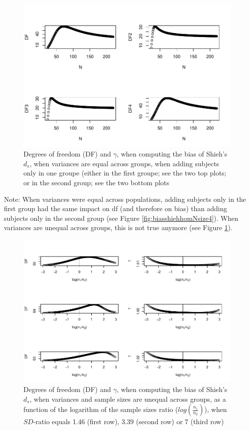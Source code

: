 \documentclass[
  man]{apa6}
\begin{document}
\begin{figure}
\centering
\includegraphics{Theoretical-Bias-of-all-estimators-as-a-function-of-population-parameters_files/figure-latex/biasshiehhetunbalNsize4-1.pdf}
\caption{\label{fig:biasshiehhetunbalNsize4}Degrees of freedom (DF) and \(\gamma\), when computing the bias of Shieh's \(d_s\), when variances are equal across groups, when adding subjects only in one groupe (either in the first groupe; see the two top plots; or in the second group; see the two bottom plots}
\end{figure}

Note: When variances were equal across populations, adding subjects only in the first group had the same impact on df (and therefore on bias) than adding subjects only in the second group (see Figure \ref{fig:biasshiehhomNsize4}). When variances are unequal across groups, this is not true anymore (see Figure \ref{fig:biasshiehhetunbalNsize4}).

\begin{figure}
\centering
\includegraphics{Theoretical-Bias-of-all-estimators-as-a-function-of-population-parameters_files/figure-latex/biasshiehhetunbaldfandbias-1.pdf}
\caption{\label{fig:biasshiehhetunbaldfandbias}Degrees of freedom (DF) and \(\gamma\), when computing the bias of Shieh's \(d_s\), when variances and sample sizes are unequal across groups, as a function of the logarithm of the sample sizes ratio (\(log \left( \frac{n_1}{n_2} \right)\)), when \(SD\)-ratio equals 1.46 (first row), 3.39 (second row) or 7 (third row)}
\end{figure}
\end{document}
